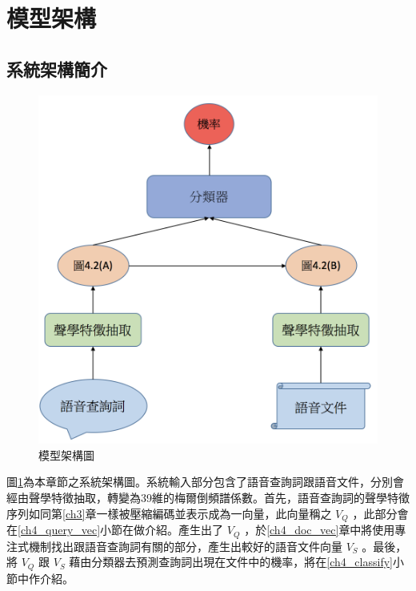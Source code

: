 \section{模型架構}
\subsection{系統架構簡介}
\begin{figure}[h]
\centering
\includegraphics[scale=0.5]{images/ch4_model.png} 
\caption{模型架構圖}
\label{ch4_system}
\end{figure}
圖\ref{ch4_system}為本章節之系統架構圖。系統輸入部分包含了語音查詢詞跟語音文件，分別會經由聲學特徵抽取，轉變為39維的梅爾倒頻譜係數。首先，語音查詢詞的聲學特徵序列如同第\ref{ch3}章一樣被壓縮編碼並表示成為一向量，此向量稱之
$V_Q$ ，此部分會在\ref{ch4_query_vec}小節在做介紹。產生出了 $V_Q$
，於\ref{ch4_doc_vec}章中將使用專注式機制找出跟語音查詢詞有關的部分，產生出較好的語音文件向量
$V_S$ 。最後，將 $V_Q$ 跟 $V_S$
藉由分類器去預測查詢詞出現在文件中的機率，將在\ref{ch4_classify}小節中作介紹。
